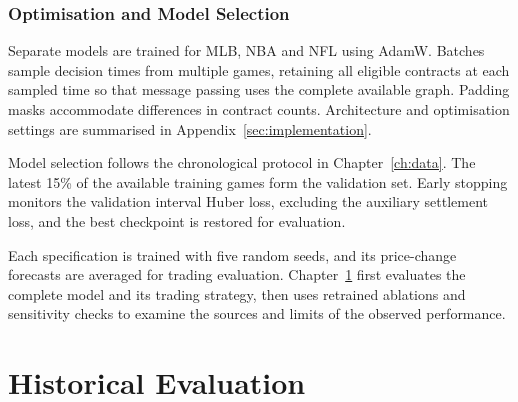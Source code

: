 \documentclass[12pt,a4paper,oneside]{report}
\begin{document}
\subsection{Optimisation and Model Selection}
Separate models are trained for MLB, NBA and NFL using AdamW. Batches sample
decision times from multiple games, retaining all eligible contracts at each
sampled time so that message passing uses the complete available graph.
Padding masks accommodate differences in contract counts. Architecture and
optimisation settings are summarised in Appendix~\ref{sec:implementation}.

Model selection follows the chronological protocol in Chapter~\ref{ch:data}.
The latest 15\% of the available training games form the validation set. Early
stopping monitors the validation interval Huber loss, excluding the auxiliary
settlement loss, and the best checkpoint is restored for evaluation.

Each specification is trained with five random seeds, and its price-change
forecasts are averaged for trading evaluation. Chapter~\ref{ch:experiments}
first evaluates the complete model and its trading strategy, then uses
retrained ablations and sensitivity checks to examine the sources and limits
of the observed performance.

\chapter{Historical Evaluation}
\label{ch:experiments}
\end{document}
